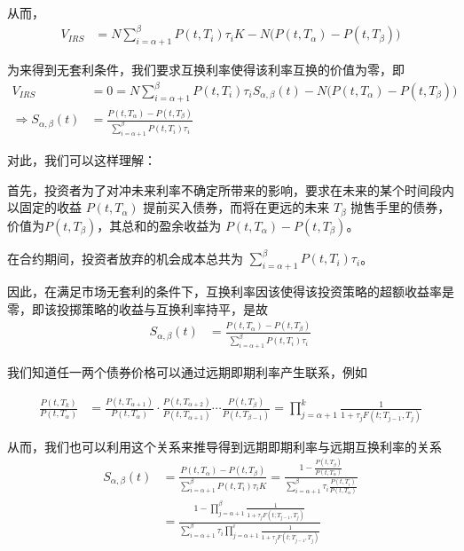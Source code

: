 从而，
\begin{align}
 V_{IRS} &=  N \sum_{i=\alpha+1}^{\beta}  P(t, T_i) \tau_i  K - N \bigg( P(t,T_{\alpha}) - P(t,T_{\beta}) \bigg)
\end{align}

为来得到无套利条件，我们要求互换利率使得该利率互换的价值为零，即
\begin{align}
 V_{IRS} &= 0 = N \sum_{i=\alpha+1}^{\beta}  P(t, T_i) \tau_i   S_{\alpha, \beta} (t)  - N \bigg( P(t,T_{\alpha}) - P(t,T_{\beta}) \bigg) \nonumber \\
 \Rightarrow 
 S_{\alpha, \beta} (t) &= \frac{ P(t,T_{\alpha}) - P(t,T_{\beta}) }{ \sum_{i=\alpha+1}^{\beta}  P(t, T_i) \tau_i } \label{swap-rate}
 \end{align}

对此，我们可以这样理解：
\begin{compactitem}
 \item 首先，投资者为了对冲未来利率不确定所带来的影响，要求在未来的某个时间段内以固定的收益 $P(t,T_{\alpha})$ 提前买入债券，而将在更远的未来 $T_{\beta}$ 抛售手里的债券，价值为$P(t,T_{\beta})$，其总和的盈余收益为 $P(t,T_{\alpha}) - P(t,T_{\beta})$。
 \item 在合约期间，投资者放弃的机会成本总共为 $\sum_{i=\alpha+1}^{\beta}  P(t, T_i) \tau_i$。
 \item 因此，在满足市场无套利的条件下，互换利率因该使得该投资策略的超额收益率是零，即该投掷策略的收益与互换利率持平，是故
\begin{align*}
 S_{\alpha, \beta} (t) &= \frac{ P(t,T_{\alpha}) - P(t,T_{\beta}) }{ \sum_{i=\alpha+1}^{\beta}  P(t, T_i) \tau_i   }
 \end{align*}
\end{compactitem}

我们知道任一两个债券价格可以通过远期即期利率产生联系，例如

\begin{align*}
 \frac{P(t,T_{k})}{P(t,T_{\alpha})}
 &= \frac{P(t,T_{\alpha + 1})}{P(t,T_{\alpha})} \cdot \frac{P(t,T_{\alpha + 2})}{P(t,T_{\alpha + 1})} \cdots \frac{P(t,T_{\beta})}{P(t,T_{\beta - 1})} = \prod_{j=\alpha+1}^{k} \frac{1}{1 + \tau_j F(t;T_{j-1}, T_j)}
\end{align*}

从而，我们也可以利用这个关系来推导得到远期即期利率与远期互换利率的关系
\begin{align}
 S_{\alpha, \beta} (t) &= \frac{ P(t,T_{\alpha}) - P(t,T_{\beta}) }{ \sum_{i=\alpha+1}^{\beta}  P(t, T_i) \tau_i  K } = \frac{ 1 - \frac{P(t,T_{\beta})}{P(t,T_{\alpha})} }{ \sum_{i=\alpha+1}^{\beta} \tau_i \frac{P(t, T_i) }{ P(t,T_{\alpha}) } }  \nonumber \\
 &= \frac{ 1 - \prod_{j=\alpha+1}^{\beta} \frac{1}{1 + \tau_j F(t;T_{j-1}, T_j)} }{ \sum_{i=\alpha+1}^{\beta} \tau_i \prod_{j=\alpha+1}^{i} \frac{1}{1 + \tau_j F(t;T_{j-1}, T_j)}  }   \label{swap-forward}
 \end{align}

